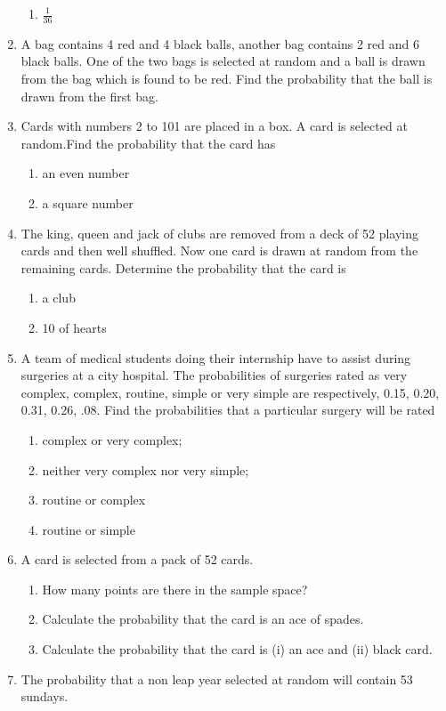 \begin{enumerate}[label=\thesection.\arabic*,ref=\thesection.\theenumi]
\begin{enumerate}
    \item $\frac{1}{36}$ 
\end{enumerate}
\solution
		
	\item A bag contains 4 red and 4 black balls, another bag contains 2 red and 6 black balls. One of the two bags is selected at random and a ball is drawn from the bag which is found to be red. Find the probability that the ball is drawn from the first bag.
\\
\solution
		
  \item
  Cards with numbers 2 to 101 are placed in a box. A card is selected at random.Find the probability that the card has
\begin{enumerate}[label=(\roman*)]
	\item an even number 
	\item a square number
\end{enumerate}
\solution

\item
The king, queen and jack of clubs are removed from a deck of 52 playing cards and then well shuffled. Now one card is drawn at random from the remaining cards.  Determine the probability that the card is
\begin{enumerate}[label=(\roman*)]
\item a club
\item 10 of hearts
\end{enumerate}
\solution

\item A team of medical students doing their internship have to assist during surgeries
at a city hospital. The probabilities of surgeries rated as very complex, complex,
routine, simple or very simple are respectively, 0.15, 0.20, 0.31, 0.26, .08. Find
the probabilities that a particular surgery will be rated
\begin{enumerate}
	\item complex or very complex;
	\item neither very complex nor very simple;
	\item routine or complex
	\item routine or simple
\end{enumerate}
\solution

\item A card is selected from a pack of 52 cards.
\begin{enumerate}[label=(\alph*)]
    \item How many points are there in the sample space?
    \item Calculate the probability that the card is an ace of spades.
    \item Calculate the probability that the card is (i) an ace and (ii) black card.
\end{enumerate}
\solution

\item The probability that a non leap year selected at random will contain 53 sundays.
\\
\solution

\end{enumerate}
